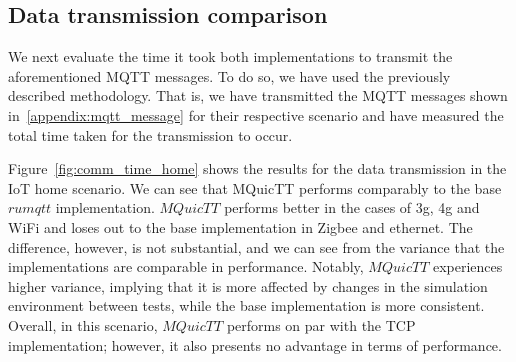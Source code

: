 \subsection{Data transmission comparison}

We next evaluate the time it took both implementations to transmit the aforementioned MQTT messages.
To do so, we have used the previously described methodology.
That is, we have transmitted the MQTT messages shown in~\ref{appendix:mqtt_message} for their respective scenario and have measured the total time taken for the transmission to occur.

Figure~\ref{fig:comm_time_home} shows the results for the data transmission in the IoT home scenario.
We can see that MQuicTT performs comparably to the base $rumqtt$ implementation.
$MQuicTT$ performs better in the cases of 3g, 4g and WiFi and loses out to the base implementation in Zigbee and ethernet.
The difference, however, is not substantial, and we can see from the variance that the implementations are comparable in performance.
Notably, $MQuicTT$ experiences higher variance, implying that it is more affected by changes in the simulation environment between tests, while the base implementation is more consistent.
Overall, in this scenario, $MQuicTT$ performs on par with the TCP implementation; however, it also presents no advantage in terms of performance.

